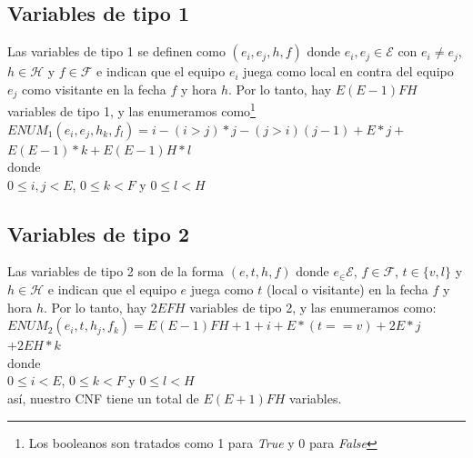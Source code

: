 \documentclass[a4paper,10pt]{article}
\begin{document}
  \subsection{Variables de tipo 1}
    Las variables de tipo 1 se definen como $(e_i,e_j,h,f)$ donde 
    $e_i,e_j \in \mathcal{E}$ con $e_i \neq e_j$, $h \in \mathcal{H}$ y 
    $f \in \mathcal{F}$ e indican que el equipo $e_i$ juega como local en contra 
    del equipo $e_j$ como visitante en la fecha $f$ y hora $h$. Por lo tanto, 
    hay $E(E-1)FH$ variables de tipo 1, y las enumeramos como\footnote{Los 
    booleanos son tratados como 1 para \textit{True} y 0 para \textit{False}} \\

    \noindent
    $ENUM_1(e_i, e_j, h_k, f_l) = i - (i > j)*j - (j > i)(j - 1) + E*j + $
    $E(E - 1)*k + E(E - 1)H*l$  \\ 

    \noindent
    donde \\

    \noindent
    $0 \leq i, j < E$, $0 \leq k < F$ y $0 \leq l < H$\\
  
  \subsection{Variables de tipo 2}
    Las variables de tipo 2 son de la forma $(e,t,h,f)$ donde $e_ \in \mathcal{E}$, 
    $f \in \mathcal{F}$, $t \in \{v, l\}$ y $h \in \mathcal{H}$ e indican que el 
    equipo $e$ juega como $t$ (local o visitante) en la fecha $f$ y hora $h$. Por 
    lo tanto, hay $2E F H$ variables de tipo 2, y las enumeramos 
    como: \\

    \noindent
    $ENUM_2(e_i, t, h_j, f_k) = E (E-1) F H + 1 + i + E * (t == v) + 2 E*j$
    $ + 2 E H*k$  \\ 

    \noindent
    donde \\

    \noindent
    $0 \leq i < E$, $0 \leq k < F$ y $0 \leq l < H$\\

    \noindent
    as\'i, nuestro CNF tiene un total de $E(E+1)FH$ variables.
\end{document}
